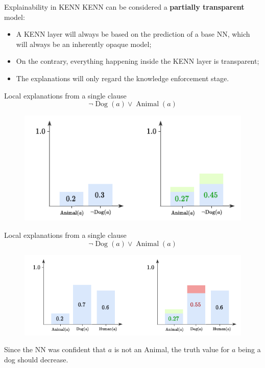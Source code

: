 \documentclass{beamer}
\begin{document}
\begin{frame}{Explainability in KENN}
KENN can be considered a \textbf{partially transparent} model:
\begin{itemize}
	\item A KENN layer will always be based on the prediction of a base NN, which will always be an inherently opaque model;
	\item On the contrary, everything happening inside the KENN layer is transparent;
	\item The explanations will only regard the knowledge enforcement stage.
\end{itemize}
\end{frame}


\begin{frame}{Local explanations from a single clause}
	$$\neg \operatorname{Dog}(a) \vee \operatorname{Animal}(a) $$ \pause
	\begin{figure}
		\includegraphics[width=0.9\linewidth]{images/explainability_example1.pdf}
	\end{figure}
\end{frame}

\begin{frame}{Local explanations from a single clause}
	$$\neg \operatorname{Dog}(a) \vee \operatorname{Animal}(a) $$
	\begin{figure}
		\includegraphics[width=0.9\linewidth]{images/explainability_example2.pdf}
	\end{figure}
\pause
Since the NN was confident that $a$ is not an Animal, the truth value for $a$ being a dog should decrease.
\end{frame}
\end{document}
